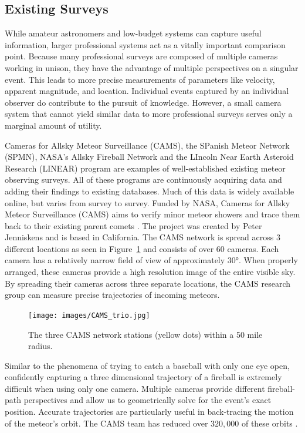 \subsection{Existing Surveys}
While amateur astronomers and low-budget systems can capture useful information, larger professional systems act as a vitally important comparison point.
Because many professional surveys are composed of multiple cameras working in unison, they have the advantage of multiple perspectives on a singular event.
This leads to more precise measurements of parameters like velocity, apparent magnitude, and location.
Individual events captured by an individual observer do contribute to the pursuit of knowledge.
However, a small camera system that cannot yield similar data to more professional surveys serves only a marginal amount of utility.

Cameras for Allsky Meteor Surveillance (CAMS), the SPanish Meteor Network (SPMN), NASA's Allsky Fireball Network and the LIncoln Near Earth Asteroid Research (LINEAR) program are examples of well-established existing meteor observing surveys.
All of these programs are continuously acquiring data and adding their findings to existing databases.  
Much of this data is widely available online, but varies from survey to survey.
Funded by NASA, Cameras for Allsky Meteor Surveillance (CAMS) aims to verify minor meteor showers and trace them back to their existing parent comets \cite{jenniskens_cams:_2011}.  
The project was created by Peter Jenniskens and is based in California.  
The CAMS network is spread across 3 different locations as seen in Figure~\ref{trio} and consists of over 60 cameras.
Each camera has a relatively narrow field of view of approximately \ang{30}.
When properly arranged, these cameras provide a high resolution image of the entire visible sky.
By spreading their cameras across three separate locations, the CAMS research group can measure precise trajectories of incoming meteors. 

\begin{figure}[ht!]
  \centering
  \texttt{[image: images/CAMS\_trio.jpg]}
  \caption{The three CAMS network stations (yellow dots) within a 50 mile radius.}
  \label{trio}
\end{figure}



Similar to the phenomena of trying to catch a baseball with only one eye open, confidently capturing a three dimensional trajectory of a fireball is extremely difficult when using only one camera.
Multiple cameras provide different fireball-path perspectives and allow us to geometrically solve for the event's exact position.
Accurate trajectories are particularly useful in back-tracing the motion of the meteor's orbit.  
The CAMS team has reduced over $320,000$ of these orbits \cite{peter_jenniskens_cameras_2018}.


